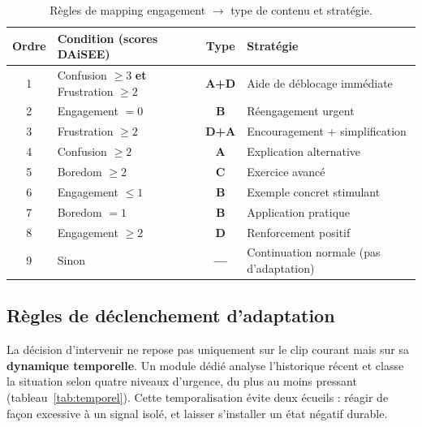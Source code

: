 \begin{table}[H]
\centering
\renewcommand{\arraystretch}{1.25}
\begin{tabular}{c p{6.6cm} >{\bfseries}c l}
\toprule
Ordre & Condition (scores DAiSEE) & Type & Stratégie \\
\midrule
1 & Confusion $\geq 3$ \textbf{et} Frustration $\geq 2$ & A+D & Aide de déblocage immédiate \\
2 & Engagement $= 0$                                    & B   & Réengagement urgent \\
3 & Frustration $\geq 2$                                & D+A & Encouragement + simplification \\
4 & Confusion $\geq 2$                                  & A   & Explication alternative \\
5 & Boredom $\geq 2$                                    & C   & Exercice avancé \\
6 & Engagement $\leq 1$                                 & B   & Exemple concret stimulant \\
7 & Boredom $= 1$                                       & B   & Application pratique \\
8 & Engagement $\geq 2$                                 & D   & Renforcement positif \\
9 & Sinon                                               & --- & Continuation normale (pas d'adaptation) \\
\bottomrule
\end{tabular}
\caption{Règles de mapping engagement $\rightarrow$ type de contenu et stratégie.}
\label{tab:mapping}
\end{table}

\subsection{Règles de déclenchement d'adaptation}

La décision d'intervenir ne repose pas uniquement sur le clip courant mais sur sa
\textbf{dynamique temporelle}. Un module dédié analyse l'historique récent et
classe la situation selon quatre niveaux d'urgence, du plus au moins pressant
(tableau~\ref{tab:temporel}). Cette temporalisation évite deux écueils : réagir de
façon excessive à un signal isolé, et laisser s'installer un état négatif durable.

